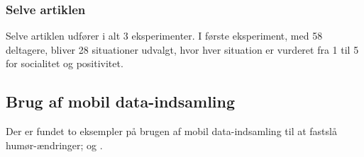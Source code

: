 \subsubsection{Selve artiklen}
Selve artiklen udfører i alt 3 eksperimenter.
I første eksperiment, med 58 deltagere, bliver 28 situationer udvalgt, hvor hver situation er vurderet fra 1 til 5 for socialitet og positivitet.



\subsection{Brug af mobil data-indsamling}
Der er fundet to eksempler på brugen af mobil data-indsamling til at fastslå humør-ændringer; \citet{social_sensing} og \citet{social_sensing_2}.
